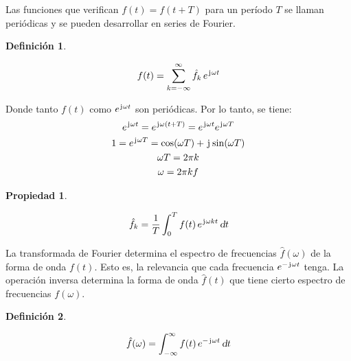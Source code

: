 \documentclass[a5paper,12pt,twoside]{book}
\newtheorem{defn}{{Definición}}[chapter]
\newtheorem{prop}{{Propiedad}}[chapter]
\begin{document}
Las funciones que verifican $f(t)=f(t+T)$ para un período $T$ se llaman periódicas y se pueden desarrollar en series de Fourier.

\begin{mdframed}[style=DefinitionFrame]
    \begin{defn}
    \end{defn}
    \begin{equation*}
        f(t) = \sum_{k=-\infty}^{\infty} \hat{f}_k \, e^{\mkern2mu\mathrm{j}\mkern1mu \omega t}
    \end{equation*}
\end{mdframed}

Donde tanto $f(t)$ como $e^{\mkern2mu\mathrm{j}\mkern1mu \omega t}$ son periódicas.
Por lo tanto, se tiene:
\begin{gather*}
    e^{\mkern2mu\mathrm{j}\mkern1mu \omega t} = e^{\mkern2mu\mathrm{j}\mkern1mu \omega (t+T)} = e^{\mkern2mu\mathrm{j}\mkern1mu \omega t} e^{\mkern2mu\mathrm{j}\mkern1mu \omega T}
    \\
    1 = e^{\mkern2mu\mathrm{j}\mkern1mu \omega T} = \cos(\omega T) + \mkern2mu\mathrm{j}\mkern1mu \sin(\omega T)
    \\
    \omega T = 2 \pi k
    \\
    \omega = 2 \pi k f
\end{gather*}

\begin{mdframed}[style=PropertyFrame]
    \begin{prop}
    \end{prop}
    \begin{equation*}
        \hat{f}_k = \frac{1}{T} \int_0^T f(t) \, e^{\mkern2mu\mathrm{j}\mkern1mu \omega k t} \, \textsl{d} t
    \end{equation*}
\end{mdframed}

La transformada de Fourier determina el espectro de frecuencias $\hat{f}(\omega)$ de la forma de onda $f(t)$.
Esto es, la relevancia que cada frecuencia $e^{-\mkern2mu\mathrm{j}\mkern1mu \omega t}$ tenga.
La operación inversa determina la forma de onda $\hat{f}(t)$ que tiene cierto espectro de frecuencias $f(\omega)$.

\begin{mdframed}[style=DefinitionFrame]
    \begin{defn}
    \end{defn}
    \begin{equation*}
        \hat{f}(\omega) = \int_{-\infty}^{\infty} f(t) \, e^{-\mkern2mu\mathrm{j}\mkern1mu \omega t} \, \textsl{d} t
    \end{equation*}
\end{mdframed}
\end{document}

